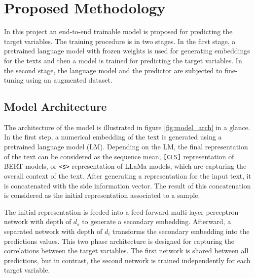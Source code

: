 \documentclass[10pt,conference,compsocconf]{IEEEtran}
\begin{document}
\section{Proposed Methodology}\label{sec: Proposed Methodology}

In this project an end-to-end trainable model is proposed for predicting the target variables. The training procedure is in two stages. In the first stage, a pretrained language model with frozen weights is used for generating embeddings for the texts and then a model is trained for predicting the target variables. In the second stage, the language model and the predictor are subjected to fine-tuning using an augmented dataset.

\subsection{Model Architecture}\label{sec: Model Architecture}

The architecture of the model is illustrated in figure \ref{fig:model_arch} in a glance. In the first step, a numerical embedding of the text is generated using a pretrained language model (LM). Depending on the LM, the final representation of the text can be considered as the sequence mean, \texttt{[CLS]} representation of BERT models, or \texttt{<s>} representation of LLaMa models, which are capturing the overall context of the text. After generating a representation for the input text, it is concatenated with the side information vector. The result of this concatenation is considered as the initial representation associated to a sample.

The initial representation is feeded into a feed-forward multi-layer perceptron network with depth of $d_s$ to generate a secondary embedding. Afterward, a separated network with depth of $d_i$ transforms the secondary embedding into the predictions values. This two phase architecture is designed for capturing the correlations between the target variables. The first network is shared between all predictions, but in contrast, the second network is trained independently for each target variable.
\end{document}
